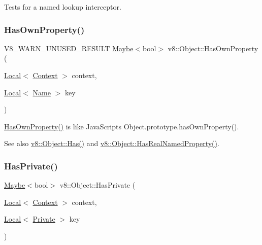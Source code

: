 Tests for a named lookup interceptor. \mbox{\label{classv8_1_1Object_acdd3921e95d5bb1a27cea489792607ff}} 
\subsubsection{\texorpdfstring{Has\+Own\+Property()}{HasOwnProperty()}}
{\footnotesize\ttfamily V8\+\_\+\+W\+A\+R\+N\+\_\+\+U\+N\+U\+S\+E\+D\+\_\+\+R\+E\+S\+U\+LT \mbox{\hyperlink{classv8_1_1Maybe}{Maybe}}$<$bool$>$ v8\+::\+Object\+::\+Has\+Own\+Property (\begin{DoxyParamCaption}\item[{\mbox{\hyperlink{classv8_1_1Local}{Local}}$<$ \mbox{\hyperlink{classv8_1_1Context}{Context}} $>$}]{context,  }\item[{\mbox{\hyperlink{classv8_1_1Local}{Local}}$<$ \mbox{\hyperlink{classv8_1_1Name}{Name}} $>$}]{key }\end{DoxyParamCaption})}

\mbox{\hyperlink{classv8_1_1Object_acdd3921e95d5bb1a27cea489792607ff}{Has\+Own\+Property()}} is like Java\+Script\textquotesingle{}s Object.\+prototype.\+has\+Own\+Property().

See also \mbox{\hyperlink{classv8_1_1Object_a57d4819c2cc13715ed22dd23cdc84d7c}{v8\+::\+Object\+::\+Has()}} and \mbox{\hyperlink{classv8_1_1Object_ad830b937c7586fe2086b288ea79935c4}{v8\+::\+Object\+::\+Has\+Real\+Named\+Property()}}. \mbox{\label{classv8_1_1Object_aad699867935fd2142ec97afa6e39a7f0}} 
\subsubsection{\texorpdfstring{Has\+Private()}{HasPrivate()}}
{\footnotesize\ttfamily \mbox{\hyperlink{classv8_1_1Maybe}{Maybe}}$<$bool$>$ v8\+::\+Object\+::\+Has\+Private (\begin{DoxyParamCaption}\item[{\mbox{\hyperlink{classv8_1_1Local}{Local}}$<$ \mbox{\hyperlink{classv8_1_1Context}{Context}} $>$}]{context,  }\item[{\mbox{\hyperlink{classv8_1_1Local}{Local}}$<$ \mbox{\hyperlink{classv8_1_1Private}{Private}} $>$}]{key }\end{DoxyParamCaption})}

